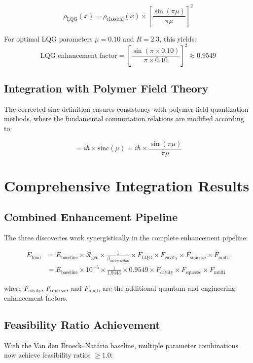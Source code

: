\documentclass[11pt]{article}
\begin{document}
\begin{equation}
\rho_{\text{LQG}}(x) = \rho_{\text{classical}}(x) \times \left[\frac{\sin(\pi\mu)}{\pi\mu}\right]^2
\end{equation}

For optimal LQG parameters $\mu = 0.10$ and $R = 2.3$, this yields:
\begin{equation}
\text{LQG enhancement factor} = \left[\frac{\sin(\pi \times 0.10)}{\pi \times 0.10}\right]^2 \approx 0.9549
\end{equation}

\subsection{Integration with Polymer Field Theory}
The corrected sinc definition ensures consistency with polymer field quantization methods, where the fundamental commutation relations are modified according to:

\begin{equation}
[\hat{x}, \hat{p}] = i\hbar \times \text{sinc}(\mu) = i\hbar \times \frac{\sin(\pi\mu)}{\pi\mu}
\end{equation}

\section{Comprehensive Integration Results}

\subsection{Combined Enhancement Pipeline}
The three discoveries work synergistically in the complete enhancement pipeline:

\begin{align}
E_{\text{final}} &= E_{\text{baseline}} \times \mathcal{R}_{\text{geo}} \times \frac{1}{\beta_{\text{backreaction}}} \times F_{\text{LQG}} \times F_{\text{cavity}} \times F_{\text{squeeze}} \times F_{\text{multi}} \\
&= E_{\text{baseline}} \times 10^{-5} \times \frac{1}{1.9443} \times 0.9549 \times F_{\text{cavity}} \times F_{\text{squeeze}} \times F_{\text{multi}}
\end{align}

where $F_{\text{cavity}}$, $F_{\text{squeeze}}$, and $F_{\text{multi}}$ are the additional quantum and engineering enhancement factors.

\subsection{Feasibility Ratio Achievement}
With the Van den Broeck–Natário baseline, multiple parameter combinations now achieve feasibility ratios $\geq 1.0$:
\end{document}
